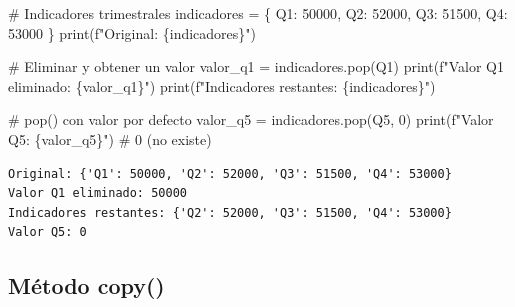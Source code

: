 \documentclass[
  doc,
  floatsintext,
  longtable,
  a4paper,
  nolmodern,
  notxfonts,
  notimes,
  12pt,
  colorlinks=true,linkcolor=blue,citecolor=blue,urlcolor=blue]{apa7}
\newenvironment{Shaded}{\begin{snugshade}}{\end{snugshade}}
\newcommand{\BuiltInTok}[1]{\textcolor[rgb]{0.00,0.23,0.31}{#1}}
\newcommand{\CommentTok}[1]{\textcolor[rgb]{0.37,0.37,0.37}{#1}}
\newcommand{\DecValTok}[1]{\textcolor[rgb]{0.68,0.00,0.00}{#1}}
\newcommand{\NormalTok}[1]{\textcolor[rgb]{0.00,0.23,0.31}{#1}}
\newcommand{\OperatorTok}[1]{\textcolor[rgb]{0.37,0.37,0.37}{#1}}
\newcommand{\SpecialCharTok}[1]{\textcolor[rgb]{0.37,0.37,0.37}{#1}}
\newcommand{\SpecialStringTok}[1]{\textcolor[rgb]{0.13,0.47,0.30}{#1}}
\newcommand{\StringTok}[1]{\textcolor[rgb]{0.13,0.47,0.30}{#1}}
\begin{document}
\begin{Shaded}
\begin{Highlighting}[]
\CommentTok{\# Indicadores trimestrales}
\NormalTok{indicadores }\OperatorTok{=}\NormalTok{ \{}
    \StringTok{\textquotesingle{}Q1\textquotesingle{}}\NormalTok{: }\DecValTok{50000}\NormalTok{,}
    \StringTok{\textquotesingle{}Q2\textquotesingle{}}\NormalTok{: }\DecValTok{52000}\NormalTok{,}
    \StringTok{\textquotesingle{}Q3\textquotesingle{}}\NormalTok{: }\DecValTok{51500}\NormalTok{,}
    \StringTok{\textquotesingle{}Q4\textquotesingle{}}\NormalTok{: }\DecValTok{53000}
\NormalTok{\}}
\BuiltInTok{print}\NormalTok{(}\SpecialStringTok{f"Original: }\SpecialCharTok{\{}\NormalTok{indicadores}\SpecialCharTok{\}}\SpecialStringTok{"}\NormalTok{)}

\CommentTok{\# Eliminar y obtener un valor}
\NormalTok{valor\_q1 }\OperatorTok{=}\NormalTok{ indicadores.pop(}\StringTok{\textquotesingle{}Q1\textquotesingle{}}\NormalTok{)}
\BuiltInTok{print}\NormalTok{(}\SpecialStringTok{f"Valor Q1 eliminado: }\SpecialCharTok{\{}\NormalTok{valor\_q1}\SpecialCharTok{\}}\SpecialStringTok{"}\NormalTok{)}
\BuiltInTok{print}\NormalTok{(}\SpecialStringTok{f"Indicadores restantes: }\SpecialCharTok{\{}\NormalTok{indicadores}\SpecialCharTok{\}}\SpecialStringTok{"}\NormalTok{)}

\CommentTok{\# pop() con valor por defecto}
\NormalTok{valor\_q5 }\OperatorTok{=}\NormalTok{ indicadores.pop(}\StringTok{\textquotesingle{}Q5\textquotesingle{}}\NormalTok{, }\DecValTok{0}\NormalTok{)}
\BuiltInTok{print}\NormalTok{(}\SpecialStringTok{f"Valor Q5: }\SpecialCharTok{\{}\NormalTok{valor\_q5}\SpecialCharTok{\}}\SpecialStringTok{"}\NormalTok{)  }\CommentTok{\# 0 (no existe)}
\end{Highlighting}
\end{Shaded}

\begin{verbatim}
Original: {'Q1': 50000, 'Q2': 52000, 'Q3': 51500, 'Q4': 53000}
Valor Q1 eliminado: 50000
Indicadores restantes: {'Q2': 52000, 'Q3': 51500, 'Q4': 53000}
Valor Q5: 0
\end{verbatim}

\subsection{Método copy()}\label{muxe9todo-copy}
\end{document}
